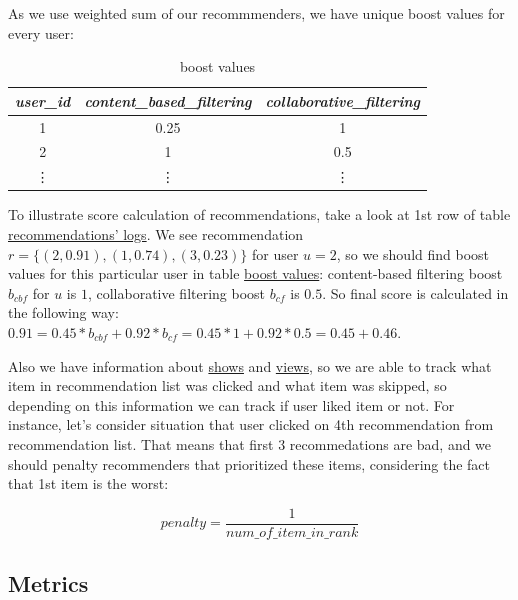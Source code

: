 \documentclass{article}
\begin{document}
    As we use weighted sum of our recommmenders, we have unique boost values for every user:

    \begin{table}[h]
        \centering
        \begin{tabular}{ccc}
            \toprule
            \textit{user\_id} & \textit{content\_based\_filtering} & \textit{collaborative\_filtering} \\
            \midrule
            1                 & 0.25                                  & 1                               \\
            2                 & 1                               & 0.5                                \\
            \vdots & \vdots & \vdots \\
            \bottomrule
            \end{tabular}%
        \caption{boost values}
        \label{tab:boost_values}
    \end{table}

    To illustrate score calculation of recommendations, take a look at 1st row of table \hyperref[tab:recommendation_logs]{recommendations' logs}. We see recommendation $r = \{(2, 0.91), (1, 0.74), (3, 0.23)\}$ for user $u = 2$, so we should find boost values for this particular user in table \hyperref[tab:boost_values]{boost values}: content-based filtering boost $b_{cbf}$ for $u$ is $1$, collaborative filtering boost $b_{cf}$ is $0.5$. So final score is calculated in the following way: $0.91 = 0.45 * b_{cbf} + 0.92 * b_{cf} = 0.45 * 1 + 0.92 * 0.5 = 0.45 + 0.46$.

    Also we have information about \hyperref[tab:show]{shows} and \hyperref[tab:view]{views}, so we are able to track what item in recommendation list was clicked and what item was skipped, so depending on this information we can track if user liked item or not. For instance, let's consider situation that user clicked on 4th recommendation from recommendation list. That means that first 3 recommedations are bad, and we should penalty recommenders that prioritized these items, considering the fact that 1st item is the worst:

\begin{equation}
    \textit{penalty} = \frac{1}{\textit{num\_of\_item\_in\_rank}}
\end{equation}

\subsection{Metrics}
\end{document}
